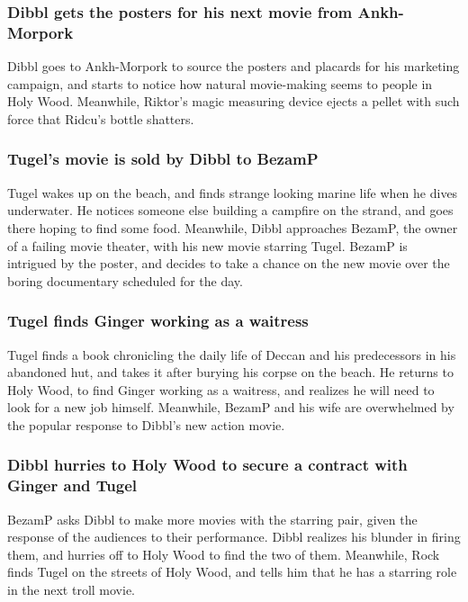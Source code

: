\subsubsection{\Gls{Dibbl} gets the posters for his next movie from Ankh-Morpork}
\Gls{Dibbl} goes to Ankh-Morpork to source the posters and placards for his marketing campaign,
and starts to notice how natural movie-making seems to people in Holy Wood. Meanwhile,
\Gls{Riktor}'s magic measuring device ejects a pellet with such force that \Gls{Ridcu}'s bottle
shatters.

\subsubsection{\Gls{Tugel}'s movie is sold by \Gls{Dibbl} to \Gls{BezamP}}
\Gls{Tugel} wakes up on the beach, and finds strange looking marine life when he dives underwater.
He notices someone else building a campfire on the strand, and goes there hoping to find some food.
Meanwhile, \Gls{Dibbl} approaches \Gls{BezamP}, the owner of a failing movie theater, with his new
movie starring \Gls{Tugel}. \Gls{BezamP} is intrigued by the poster, and decides to take a chance on
the new movie over the boring documentary scheduled for the day.

\subsubsection{\Gls{Tugel} finds \Gls{Ginger} working as a waitress}
\Gls{Tugel} finds a book chronicling the daily life of \Gls{Deccan} and his predecessors in his
abandoned hut, and takes it after burying his corpse on the beach. He returns to Holy Wood, to
find \Gls{Ginger} working as a waitress, and realizes he will need to look for a new job himself.
Meanwhile, \Gls{BezamP} and his wife are overwhelmed by the popular response to \Gls{Dibbl}'s new
action movie.

\subsubsection{\Gls{Dibbl} hurries to Holy Wood to secure a contract with \Gls{Ginger} and
    \Gls{Tugel}}
\Gls{BezamP} asks \Gls{Dibbl} to make more movies with the starring pair, given the response of
the audiences to their performance. \Gls{Dibbl} realizes his blunder in firing them, and hurries off
to Holy Wood to find the two of them. Meanwhile, \Gls{Rock} finds \Gls{Tugel} on the streets of
Holy Wood, and tells him that he has a starring role in the next troll movie.

